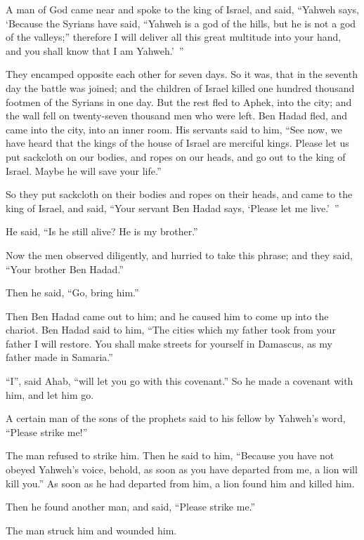 {A man of God came near and spoke to the king of Israel, and said, “Yahweh says, ‘Because the Syrians have said, “Yahweh is a god of the hills, but he is not a god of the valleys;” therefore I will deliver all this great multitude into your hand, and you shall know that I am Yahweh.’ ”
\par }{\PP {}They encamped opposite each other for seven days. So it was, that in the seventh day the battle was joined; and the children of Israel killed one hundred thousand footmen of the Syrians in one day.
But the rest fled to Aphek, into the city; and the wall fell on twenty-seven thousand men who were left. Ben Hadad fled, and came into the city, into an inner room.
His servants said to him, “See now, we have heard that the kings of the house of Israel are merciful kings. Please let us put sackcloth on our bodies, and ropes on our heads, and go out to the king of Israel. Maybe he will save your life.”
\par }{\PP {}So they put sackcloth on their bodies and ropes on their heads, and came to the king of Israel, and said, “Your servant Ben Hadad says, ‘Please let me live.’ ”
\par }{\PP He said, “Is he still alive? He is my brother.”
\par }{\PP {}Now the men observed diligently, and hurried to take this phrase; and they said, “Your brother Ben Hadad.”
\par }{\PP Then he said, “Go, bring him.”
\par }{\PP Then Ben Hadad came out to him; and he caused him to come up into the chariot.
Ben Hadad said to him, “The cities which my father took from your father I will restore. You shall make streets for yourself in Damascus, as my father made in Samaria.”
\par }{\PP “I”, said Ahab, “will let you go with this covenant.” So he made a covenant with him, and let him go.
\par }{\PP {}A certain man of the sons of the prophets said to his fellow by Yahweh’s word, “Please strike me!”
\par }{\PP The man refused to strike him.
Then he said to him, “Because you have not obeyed Yahweh’s voice, behold, as soon as you have departed from me, a lion will kill you.” As soon as he had departed from him, a lion found him and killed him.
\par }{\PP {}Then he found another man, and said, “Please strike me.”
\par }{\PP The man struck him and wounded him.
}
